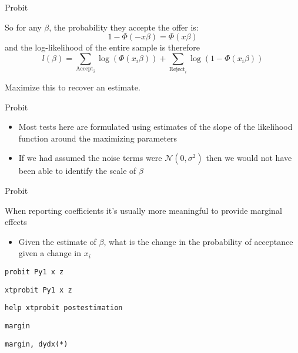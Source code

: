 \documentclass{beamer}
\begin{document}
\begin{frame}{Probit}
	\begin{card}
So for any $\beta$, the probability they accepte the offer is:
		$$1-\Phi(-x\beta)=\Phi(x\beta)$$
		and the log-likelihood of the entire sample is therefore
		$$l(\beta)=\sum_{\text{Accept}_i} \log\left(\Phi(x_i\beta)\right)+ \sum_{\text{Reject}_i} \log\left(1-\Phi(x_i\beta)\right)$$
		
Maximize this to recover an estimate.
	\end{card}
\end{frame}

\begin{frame}{Probit}
\begin{card}
\begin{itemize}
\item Most tests here are formulated using estimates of the slope of the likelihood function around the maximizing parameters
		\item If we had assumed the noise terms were $\mathcal{N}(0,\sigma^2)$ then we would not have been able to identify the scale of $\beta$
\end{itemize}
\end{card}
\end{frame}

\begin{frame}{Probit}
\begin{card}
    When reporting coefficients it's usually more meaningful to provide marginal effects
    		\begin{itemize}
    			\item Given the estimate of $\beta$, what is the change in the probability of acceptance given a change in $x_i$
    		\end{itemize}
    \end{card}
\end{frame}

\begin{frame}
    \begin{card}[STATA]
        \texttt{probit Py1 x z}
        
        \texttt{xtprobit Py1 x z}
        
        \texttt{help xtprobit postestimation}
        
        \texttt{margin}
        
        \texttt{margin, dydx(*)}
    \end{card}
\end{frame}
\end{document}
